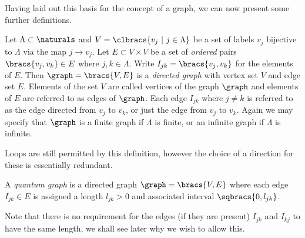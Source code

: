 Having laid out this basis for the concept of a graph, we can now present some further definitions.
\begin{definition} \label{def:DirectedGraph}
	Let $\Lambda\subset\naturals$ and $V=\clbracs{v_j \ \vert \ j\in\Lambda}$ be a set of labels $v_j$ bijective to $\Lambda$ via the map $j\rightarrow v_j$.
	Let $E\subset V\times V$ be a set of \textit{ordered} pairs $\bracs{v_j,v_k}\in E$ where $j,k\in\Lambda$.
	Write $I_{jk} = \bracs{v_j,v_k}$ for the elements of $E$.
	Then $\graph=\bracs{V,E}$ is a \textit{directed graph} with vertex set $V$ and edge set $E$.
	Elements of the set $V$ are called vertices of the graph $\graph$ and elements of $E$ are referred to as edges of $\graph$.
	Each edge $I_{jk}$ where $j\neq k$ is referred to as the edge directed from $v_j$ to $v_k$, or just the edge from $v_j$ to $v_k$. \newline
	Again we may specify that $\graph$ is a finite graph if $\Lambda$ is finite, or an infinite graph if $\Lambda$ is infinite.
\end{definition}
Loops are still permitted by this definition, however the choice of a direction for these is essentially redundant.
\begin{definition} \label{def:QuantumGraph}
	A \textit{quantum graph} is a directed graph $\graph = \bracs{V,E}$ where each edge $I_{jk}\in E$ is assigned a length $l_{jk}>0$ and associated interval $\sqbracs{0,l_{jk}}$.
\end{definition}
Note that there is no requirement for the edges (if they are present) $I_{jk}$ and $I_{kj}$ to have the same length, we shall see later why we wish to allow this. \newline

